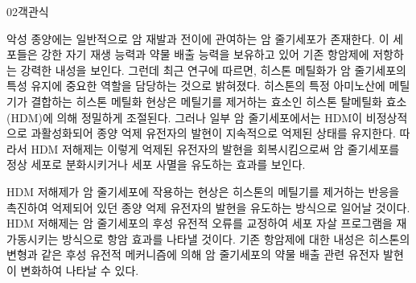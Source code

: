 \documentclass[fs85,seriesWit]{korfarm-base}
\begin{document}
\begin{kfQBlock}{02}{객관식}
\begin{kfEvidence}악성 종양에는 일반적으로 암 재발과 전이에 관여하는 암 줄기세포가 존재한다. 이 세포들은 강한 자기 재생 능력과 약물 배출 능력을 보유하고 있어 기존 항암제에 저항하는 강력한 내성을 보인다. 그런데 최근 연구에 따르면, 히스톤 메틸화가 암 줄기세포의 특성 유지에 중요한 역할을 담당하는 것으로 밝혀졌다. 히스톤의 특정 아미노산에 메틸기가 결합하는 히스톤 메틸화 현상은 메틸기를 제거하는 효소인 히스톤 탈메틸화 효소(HDM)에 의해 정밀하게 조절된다. 그러나 일부 암 줄기세포에서는 HDM이 비정상적으로 과활성화되어 종양 억제 유전자의 발현이 지속적으로 억제된 상태를 유지한다. 따라서 HDM 저해제는 이렇게 억제된 유전자의 발현을 회복시킴으로써 암 줄기세포를 정상 세포로 분화시키거나 세포 사멸을 유도하는 효과를 보인다.\end{kfEvidence}
\begin{kfChoices}
\kfChoice HDM 저해제가 암 줄기세포에 작용하는 현상은 히스톤의 메틸기를 제거하는 반응을 촉진하여 억제되어 있던 종양 억제 유전자의 발현을 유도하는 방식으로 일어날 것이다.
\kfChoice HDM 저해제는 암 줄기세포의 후성 유전적 오류를 교정하여 세포 자살 프로그램을 재가동시키는 방식으로 항암 효과를 나타낼 것이다.
\kfChoice 기존 항암제에 대한 내성은 히스톤의 변형과 같은 후성 유전적 메커니즘에 의해 암 줄기세포의 약물 배출 관련 유전자 발현이 변화하여 나타날 수 있다.
\end{kfChoices}
\end{kfQBlock}
\end{document}
